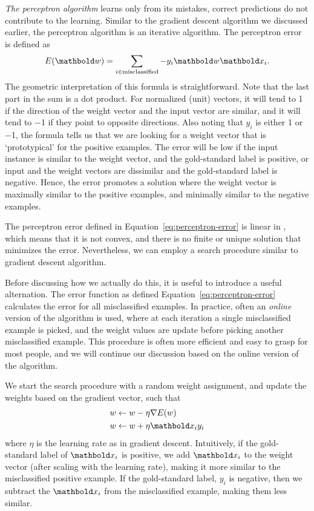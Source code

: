 \emph{The perceptron algorithm} learns only from its mistakes,
correct predictions do not contribute to the learning.
Similar to the gradient descent algorithm we discussed earlier,
the perceptron algorithm is an iterative algorithm.
The perceptron error is defined as
\begin{equation}\label{eq:perceptron-error}
  E(\vect{w}) =
    \sum_{i \in \text{misclassified}} - y_{i} \vect{w} \vect{x}_{i} .
\end{equation}
The geometric interpretation of this formula is straightforward.
Note that the last part in the sum is a dot product.
For normalized (unit) vectors,
it will tend to \num{1} if the direction of
the weight vector and the input vector are similar,
and it will tend to \num{-1} if they point to opposite directions.%
Also noting that $y_{i}$ is either \num{1} or \num{-1},
the formula tells us that we are looking for a weight vector
that is `prototypical' for the positive examples.
The error will be low if the input instance is similar to the weight vector,
and the gold-standard label is positive,
or input and the weight vectors are dissimilar
and the gold-standard label is negative.
Hence, the error promotes a solution where the weight vector is maximally
similar to the positive examples,
and minimally similar to the negative examples.

The perceptron error defined in Equation~\ref{eq:perceptron-error} is linear
in ,
which means that it is not convex,
and there is no finite or unique solution that minimizes the error.
Nevertheless, we can employ a search procedure
similar to gradient descent algorithm.

Before discussing how we actually do this,
it is useful to introduce a useful alternation.
The error function as defined Equation~\ref{eq:perceptron-error}
calculates the error for all misclassified examples.
In practice, often an \emph{online} version of the algorithm is used,
where at each iteration a single misclassified example is picked,
and the weight values are update before picking another misclassified example.
This procedure is often more efficient and easy to grasp for most people,
and we will continue our discussion
based on the online version of the algorithm.

We start the search procedure with  a random weight assignment,
and update the weights based on the gradient vector, such that
\begin{equation*}
  \begin{aligned}
    w &\leftarrow w - \eta \nabla{}E(w)\\
    w &\leftarrow w + \eta \vect{x}_{i} y_{i} \\
  \end{aligned} 
\end{equation*}
where $\eta$ is the learning rate as in gradient descent.
Intuitively, if the gold-standard label of $\vect{x}_{i}$ is positive,
we add $\vect{x}_{i}$ to the weight vector
(after scaling with the learning rate),
making it more similar to the misclassified positive example.
If the gold-standard label, $y_{i}$ is negative,
then we subtract the $\vect{x}_{i}$ from the misclassified example,
making them less similar.

